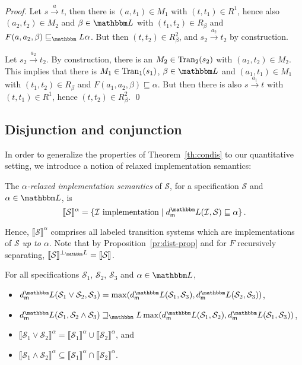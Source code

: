 \documentclass[twocolumn]{svjour3-dummy}
\newcommand*\cI{\mathcal I}
\newcommand*{\must}[1]{\overset{#1}{\longrightarrow}}
\newcommand*\Tran{\textup{\textrm{Tran}}}
\newcommand*\sem[1]{\llbracket #1\rrbracket}
\newcommand*\cS{\mathcal S}
\newcommand*\LL{\mathbbm L}
\begin{document}
\begin{proof}
  Let $s\must{ a} t$, then there is $( a, t_1)\in M_1$ with $( t,
  t_1)\in R^1$, hence also $( a_2, t_2)\in M_2$ and $\beta\in \LL$ with
  $( t_1, t_2)\in R_\beta$ and $F( a, a_2, \beta)\sqsubseteq_\LL
  \alpha$.  But then $( t, t_2)\in R^2_\beta$, and $s_2\must{ a_2} t_2$
  by construction.

  Let $s_2\must{ a_2} t_2$.  By construction, there is an $M_2\in
  \Tran_2( s_2)$ with $( a_2, t_2)\in M_2$.  This implies that there is
  $M_1\in \Tran_1( s_1)$, $\beta\in \LL$ and $( a_1, t_1)\in M_1$ with
  $( t_1, t_2)\in R_\beta$ and $F( a_1, a_2, \beta)\sqsubseteq \alpha$.
  But then there is also $s\must{ a_1} t$ with $( t, t_1)\in R^1$, hence
  $( t, t_2)\in R^2_\beta$. \qed
\end{proof}

\subsection{Disjunction and conjunction}

In order to generalize the properties of Theorem~\ref{th:condis} to our
quantitative setting, we introduce a notion of relaxed implementation
semantics:

\begin{definition}
  The \emph{$\alpha$-relaxed implementation semantics} of $\cS$, for a
  specification $\cS$ and $\alpha\in \LL$, is
  \begin{equation*}
    \sem{ \cS}^\alpha=\{
    \cI\text{ implementation}\mid \mdl( \cI, \cS)\sqsubseteq
    \alpha\}\,.
  \end{equation*}
\end{definition}

Hence, $\sem \cS^\alpha$ comprises all labeled transition systems which
are implementations of $\cS$ \emph{up to $\alpha$}.  Note that by
Proposition~\ref{pr:dist-prop} and for $F$ recursively separating,
$\sem{ \cS}^{ \bot_\LL}= \sem \cS$.

\begin{theorem}
  \label{th:condis-q}
  For all specifications $\cS_1$, $\cS_2$, $\cS_3$ and $\alpha\in \LL$,
  \begin{itemize}
  \item $\mdl( \cS_1\lor \cS_2, \cS_3)= \max( \mdl( \cS_1, \cS_3), \mdl(
    \cS_2, \cS_3))$,
  \item $\mdl( \cS_1, \cS_2\land \cS_3)\sqsupseteq_\LL \max( \mdl(
    \cS_1, \cS_2), \mdl( \cS_1, \cS_3))$,
  \item $\sem{ \cS_1\lor \cS_2}^\alpha= \sem{ \cS_1}^\alpha\cup \sem{
      \cS_2}^\alpha$, and
  \item $\sem{ \cS_1\land \cS_2}^\alpha\subseteq \sem{ \cS_1}^\alpha\cap
    \sem{ \cS_2}^\alpha$.
  \end{itemize}
\end{theorem}
\end{document}
